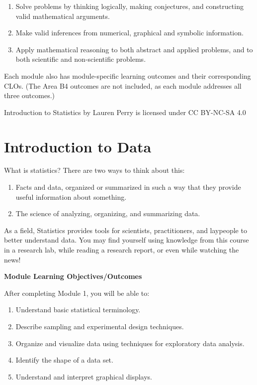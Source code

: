 \documentclass[
]{book}
\providecommand{\tightlist}{%
  \setlength{\itemsep}{0pt}\setlength{\parskip}{0pt}}
\begin{document}
\begin{enumerate}
\def\labelenumi{\Alph{enumi}.}
\tightlist
\item
  Solve problems by thinking logically, making conjectures, and constructing valid mathematical arguments.
\item
  Make valid inferences from numerical, graphical and symbolic information.
\item
  Apply mathematical reasoning to both abstract and applied problems, and to both scientific and non-scientific problems.
\end{enumerate}

Each module also has module-specific learning outcomes and their corresponding CLOs. (The Area B4 outcomes are not included, as each module addresses all three outcomes.)

Introduction to Statistics by Lauren Perry is licensed under CC BY-NC-SA 4.0

\chapter{Introduction to Data}\label{introduction-to-data}

What is statistics? There are two ways to think about this:

\begin{enumerate}
\def\labelenumi{\arabic{enumi}.}
\tightlist
\item
  Facts and data, organized or summarized in such a way that they provide useful information about something.
\item
  The science of analyzing, organizing, and summarizing data.
\end{enumerate}

As a field, Statistics provides tools for scientists, practitioners, and laypeople to better understand data. You may find yourself using knowledge from this course in a research lab, while reading a research report, or even while watching the news!

\textbf{Module Learning Objectives/Outcomes}

After completing Module 1, you will be able to:

\begin{enumerate}
\def\labelenumi{\arabic{enumi}.}
\tightlist
\item
  Understand basic statistical terminology.
\item
  Describe sampling and experimental design techniques.
\item
  Organize and visualize data using techniques for exploratory data analysis.
\item
  Identify the shape of a data set.
\item
  Understand and interpret graphical displays.
\end{enumerate}
\end{document}
